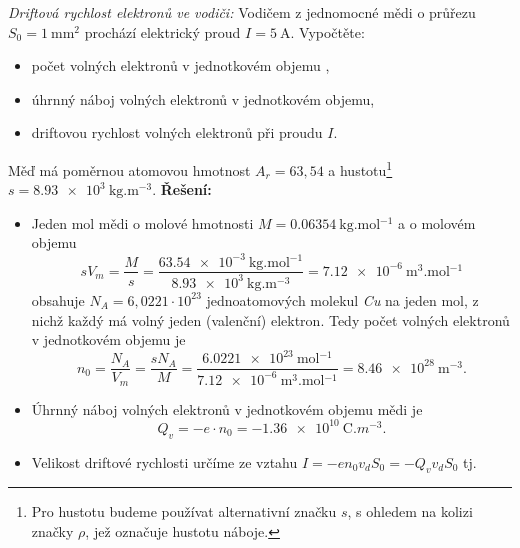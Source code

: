 \begin{mdframed}[style=mdexam]
\begin{example}\label{TEO:exam008} \emph{Driftová rychlost elektronů ve vodiči:} Vodičem z 
jednomocné mědi o
  průřezu $S_0 = \SI{1}{\mm^2}$ prochází elektrický proud $I = \SI{5}{\A}$. Vypočtěte:
  \begin{itemize}[noitemsep]
    \item počet volných elektronů v jednotkovém objemu ,
    \item úhrnný náboj volných elektronů v jednotkovém objemu,
    \item driftovou rychlost volných elektronů při proudu $I$.
  \end{itemize}
  Měď má poměrnou atomovou hmotnost $A_r = 63,54$ a hustotu\footnote{Pro hustotu budeme používat 
  alternativní značku $s$, s ohledem na kolizi značky $\rho$, jež označuje hustotu náboje.} $s = 
  \SI{8.93e3}{\kg.\m^{-3}}$.\newline  
  \textbf{Řešení:}
  \begin{itemize}
    \item Jeden mol mědi o molové hmotnosti $M = \SI{0.06354}{\kg.\mol^{-1}}$ a o molovém
          objemu 
          \begin{equation*}s
            V_m = \frac{M}{s} 
                = \frac{\SI{63.54e-3}{\kg.\mol^{-1}}}{\SI{8.93e3}{\kg.\m^{-3}}}
                = \SI{7.12e-6}{\m^3.\mol^{-1}}
          \end{equation*}
          obsahuje $N_A = 6,0221\cdot10^{23}$ jednoatomových molekul \emph{Cu} na jeden mol,
          z nichž každý má volný jeden (valenční) elektron. Tedy počet volných elektronů v
          jednotkovém objemu je 
          \begin{equation*}
            n_0 = \frac{N_A}{V_m} = \frac{sN_A}{M}                                           
                = \frac{\SI{6.0221e23}{\mol^{-1}}}{\SI{7.12e-6}{\m^{3}.\mol^{-1}}} 
                = \SI{8.46e28}{\m^{-3}}.
          \end{equation*}  
    \item Úhrnný náboj volných elektronů v jednotkovém objemu mědi je 
          \begin{equation}
            Q_v = -e\cdot n_0 = \SI{-1.36e10}{\coulomb.m^{-3}}.
          \end{equation}
    \item Velikost driftové rychlosti určíme ze vztahu $I = -en_0v_dS_0 = - Q_v v_d S_0$ tj.

\end{itemize}
\end{example}
\end{mdframed}
